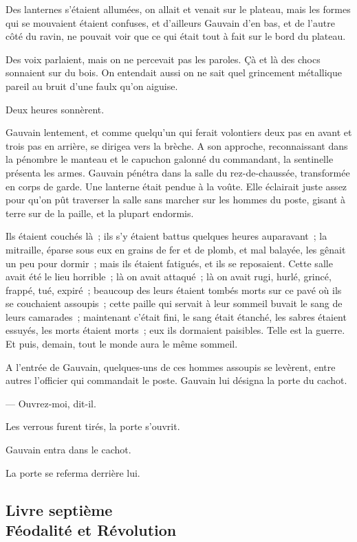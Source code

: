\documentclass[french,twoside]{book} %
\begin{document}
Des lanternes s’étaient allumées, on allait et venait sur le plateau, mais les formes qui se mouvaient étaient confuses, et d’ailleurs Gauvain d’en bas, et de l’autre côté du ravin, ne pouvait voir que ce qui était tout à fait sur le bord du plateau.\par
Des voix parlaient, mais on ne percevait pas les  paroles. Çà et là des chocs sonnaient sur du bois. On entendait aussi on ne sait quel grincement métallique pareil au bruit d’une faulx qu’on aiguise.\par
Deux heures sonnèrent.\par
Gauvain lentement, et comme quelqu’un qui ferait volontiers deux pas en avant et trois pas en arrière, se dirigea vers la brèche. A son approche, reconnaissant dans la pénombre le manteau et le capuchon galonné du commandant, la sentinelle présenta les armes. Gauvain pénétra dans la salle du rez-de-chaussée, transformée en corps de garde. Une lanterne était pendue à la voûte. Elle éclairait juste assez pour qu’on pût traverser la salle sans marcher sur les hommes du poste, gisant à terre sur de la paille, et la plupart endormis.\par
Ils étaient couchés là ; ils s’y étaient battus quelques heures auparavant ; la mitraille, éparse sous eux en grains de fer et de plomb, et mal balayée, les gênait un peu pour dormir ; mais ils étaient fatigués, et ils se reposaient. Cette salle avait été le lieu horrible ; là on avait attaqué ; là on avait rugi, hurlé, grincé, frappé, tué, expiré ; beaucoup des leurs étaient tombés morts sur ce pavé où ils se couchaient assoupis ; cette paille qui servait à leur sommeil buvait le sang de leurs camarades ; maintenant c’était fini, le sang était étanché, les sabres étaient essuyés, les morts étaient morts ; eux ils dormaient paisibles. Telle est la guerre. Et puis, demain, tout le monde aura le même sommeil.\par
A l’entrée de Gauvain, quelques-uns de ces  hommes assoupis se levèrent, entre autres l’officier qui commandait le poste. Gauvain lui désigna la porte du cachot.\par
— Ouvrez-moi, dit-il.\par
Les verrous furent tirés, la porte s’ouvrit.\par
Gauvain entra dans le cachot.\par
La porte se referma derrière lui.\par
  \subsection[{Livre septième. Féodalité et Révolution}]{Livre septième \\
Féodalité et Révolution}
\label{p3l7}
\end{document}
